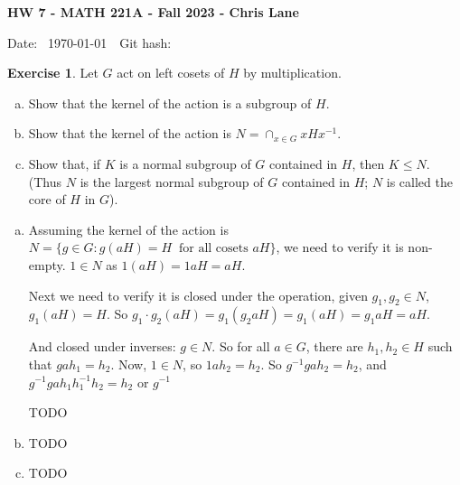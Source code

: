 \documentclass[11pt,oneside]{article}
\numberwithin{equation}{section}
\theoremstyle{definition}
\newtheorem{exercise}{Exercise}
\begin{document}
\textbf{HW 7 - MATH 221A - Fall 2023 - Chris Lane}

Date: \hhmmsstime{} \ \today \ \ Git hash: 


\begin{exercise}
  Let $G$ act on left cosets of $H$ by multiplication.
  \begin{enumerate}[(a)]
  \item
    Show that the kernel of the action is a subgroup of $H$.  
  \item
    Show that the kernel of the action is $N = \cap _{x \in G} xHx^{-1}$.
  \item
    Show that, if $K$ is a normal subgroup of $G$ contained in $H$,
    then $K \leq N$.  (Thus $N$ is the largest normal subgroup of $G$
    contained in $H$; $N$ is called the core of $H$ in $G$).
  \end{enumerate}
\end{exercise}
\begin{solution} 
  \begin{enumerate}[(a)]
  \item
    Assuming the kernel of the action is $ N = \{ g \in G : g(aH) = H \ \textrm{ for all cosets } aH \}$,
    we need to verify it is non-empty.  $1 \in N$ as $1 (aH) = 1aH = aH$.

    Next we need to verify it is closed under the operation,
    given $g_1, g_2 \in N$, $g_1(aH) = H$.  So $g_1 \cdot g_2 (aH) = g_1 (g_2aH) = g_1 (aH) = g_1 a H  = a H$.

    And closed under inverses:  $g \in N$.  So for all $a \in G$, there are $h_1, h_2 \in H$ such
    that $g a h_1 = h_2$.  Now, $1 \in N$, so $ 1 a h_2 = h_2$.  So $g^ {-1} g a h_2 = h_2$, and
    $ g ^ {-1} g a h_1 h_1^{-1} h_2 = h_2$ or $ g ^ {-1}$

    TODO
    
  \item
    TODO
  \item
    TODO
  \end{enumerate}
    
\end{solution}
\end{document}
